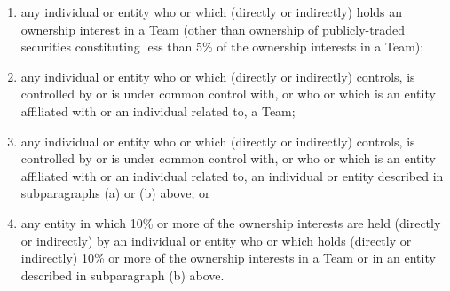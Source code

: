 \documentclass[
]{book}
\providecommand{\tightlist}{%
  \setlength{\itemsep}{0pt}\setlength{\parskip}{0pt}}
\begin{document}
\begin{enumerate}
  \begin{enumerate}
  \def\labelenumii{\arabic{enumii}.}
  \tightlist
  \item
    any individual or entity who or which (directly or indirectly) holds an ownership interest in a Team (other than ownership of publicly-traded securities constituting less than 5\% of the ownership interests in a Team);
  \item
    any individual or entity who or which (directly or indirectly) controls, is controlled by or is under common control with, or who or which is an entity affiliated with or an individual related to, a Team;
  \item
    any individual or entity who or which (directly or indirectly) controls, is controlled by or is under common control with, or who or which is an entity affiliated with or an individual related to, an individual or entity described in subparagraphs (a) or (b) above; or
  \item
    any entity in which 10\% or more of the ownership interests are held (directly or indirectly) by an individual or entity who or which holds (directly or indirectly) 10\% or more of the ownership interests in a Team or in an entity described in subparagraph (b) above.
  \end{enumerate}


\end{enumerate}
\end{document}
